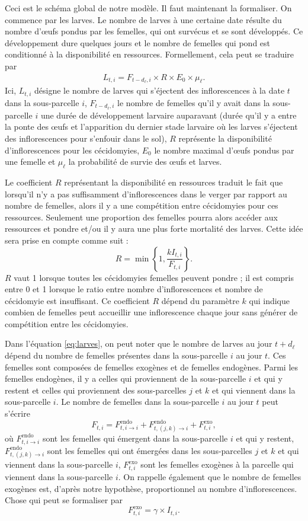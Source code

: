 Ceci est le schéma global de notre modèle.
Il faut maintenant la formaliser.
On commence par les larves.
Le nombre de larves à une certaine date résulte du nombre d'œufs pondus par les femelles, qui ont survécus et se sont développés.
Ce développement dure quelques jours et le nombre de femelles qui pond est conditionné à la disponibilité en ressources.
Formellement, cela peut se traduire par
\begin{align}
 L_{t, i} = F_{t - d_{\ell}, i} \times R \times E_0 \times \mu_{\ell}.
 \label{eq:larves}
\end{align}
Ici, $L_{t,i}$ désigne le nombre de larves qui s'éjectent des inflorescences à la date $t$ dans la sous-parcelle $i$, $F_{t - d_{\ell}, i}$ le nombre de femelles qu'il y avait dans la sous-parcelle $i$ une durée de développement larvaire auparavant (durée qu'il y a entre la ponte des œufs et l'apparition du dernier stade larvaire où les larves s'éjectent des inflorescences pour s'enfouir dans le sol), $R$ représente la disponibilité d'inflorescences pour les cécidomyies, $E_0$ le nombre maximal d'œufs pondus par une femelle et $\mu_{\ell}$ la probabilité de survie des œufs et larves.

Le coefficient $R$ représentant la disponibilité en ressources traduit le fait que lorsqu'il n'y a pas suffisamment d'inflorescences dans le verger par rapport au nombre de femelles, alors il y a une compétition entre cécidomyies pour ces ressources. Seulement une proportion des femelles pourra alors accéder aux ressources et pondre et/ou il y aura une plus forte mortalité des larves.
Cette idée sera prise en compte comme suit :
\[
R = \min\!\left\{1, \frac{k I_{t, i}}{ F_{t, i}} \right\}\!.
\]
$R$ vaut 1 lorsque toutes les cécidomyies femelles peuvent pondre ; il est compris entre 0 et 1 lorsque le ratio entre nombre d'inflorescences et nombre de cécidomyie est insuffisant.
Ce coefficient $R$ dépend du paramètre $k$ qui indique combien de femelles peut accueillir une inflorescence chaque jour sans générer de compétition entre les cécidomyies.

Dans l'équation \ref{eq:larves}, on peut noter que le nombre de larves au jour $t+d_{\ell}$ dépend du nombre de femelles présentes dans la sous-parcelle $i$ au jour $t$.
Ces femelles sont composées de femelles exogènes et de femelles endogènes.
Parmi les femelles endogènes, il y a celles qui proviennent de la sous-parcelle $i$ et qui y restent et celles qui proviennent des sous-parcelles $j$ et $k$ et qui viennent dans la sous-parcelle $i$.
Le nombre de femelles dans la sous-parcelle $i$ au jour $t$ peut s'écrire
\[
F_{t, i} = F^{\text{endo}}_{t, i\rightarrow i} + F^{\text{endo}}_{t, (j,k)\rightarrow i} + F^{\text{exo}}_{t, i}\!,
\]
où $F^{\text{endo}}_{t, i\rightarrow i}$ sont les femelles qui émergent dans la sous-parcelle $i$ et qui y restent, $F^{\text{endo}}_{t, (j,k)\rightarrow i}$ sont les femelles qui ont émergées dans les sous-parcelles $j$ et $k$ et qui viennent dans la sous-parcelle $i$, $F^{\text{exo}}_{t, i}$ sont les femelles exogènes à la parcelle qui viennent dans la sous-parcelle $i$.
On rappelle également que le nombre de femelles exogènes est, d'après notre hypothèse, proportionnel au nombre d'inflorescences. Chose qui peut se formaliser par
\[
F^{\text{exo}}_{t, i} = \gamma \times I_{t, i}.
\]


